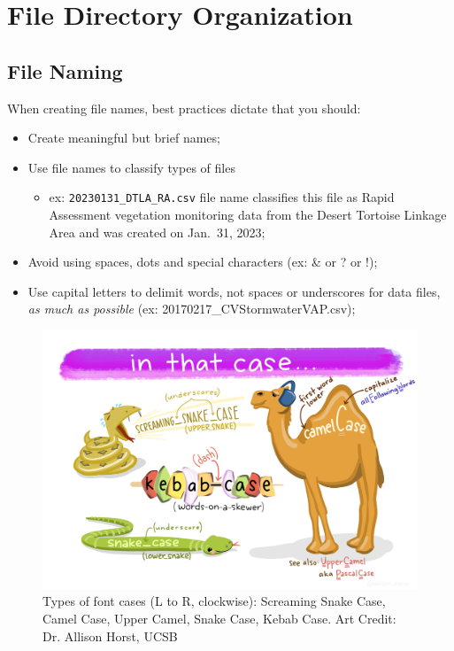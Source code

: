 \documentclass[
]{book}
\providecommand{\tightlist}{%
  \setlength{\itemsep}{0pt}\setlength{\parskip}{0pt}}
\begin{document}
\hypertarget{organization}{%
\chapter{File Directory Organization}\label{organization}}

\hypertarget{file-naming}{%
\section{File Naming}\label{file-naming}}

When creating file names, best practices dictate that you should:

\begin{itemize}
\tightlist
\item
  Create meaningful but brief names;
\item
  Use file names to classify types of files

  \begin{itemize}
  \tightlist
  \item
    ex: \texttt{20230131\_DTLA\_RA.csv} file name classifies this file as Rapid Assessment vegetation monitoring data from the Desert Tortoise Linkage Area and was created on Jan.~31, 2023;
  \end{itemize}
\item
  Avoid using spaces, dots and special characters (ex: \& or ? or !);
\item
  Use capital letters to delimit words, not spaces or underscores for data files, \emph{as much as possible} (ex: 20170217\_CVStormwaterVAP.csv);
\end{itemize}

\begin{figure}

{\centering \includegraphics[width=0.75\linewidth]{images/case_horst} 

}

\caption{Types of font cases (L to R, clockwise): Screaming Snake Case, Camel Case, Upper Camel, Snake Case, Kebab Case. Art Credit: Dr. Allison Horst, UCSB}\label{fig:case}
\end{figure}
\end{document}
